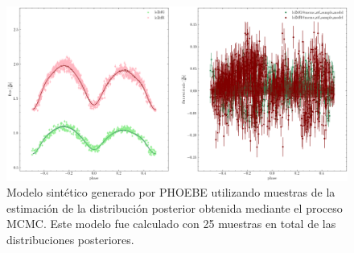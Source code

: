 \begin{figure}[!ht]
	\centering
	\includegraphics[scale=0.45]{Metodologia/Secciones/ModeloComputacional/Figures/Figura MCMC ZTF Modelo.png}
	\caption{Modelo sintético generado por PHOEBE utilizando muestras de la
	estimación de la distribución posterior obtenida mediante el proceso MCMC.
	Este modelo fue calculado con 25 muestras en total de las distribuciones
	posteriores.}
	\label{figuraMcmcZtfModeloDispersionPosterior}
\end{figure}

